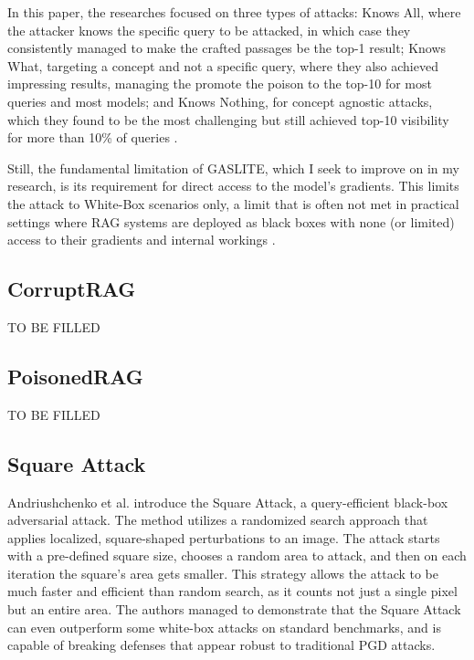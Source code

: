 \documentclass[a4paper, sigconf]{acmart}
\begin{document}
In this paper, the researches focused on three types of attacks: Knows All, where the attacker knows the specific query to be attacked, in which case they consistently managed to make the crafted passages be the top-1 result; Knows What, targeting a concept and not a specific query, where they also achieved impressing results, managing the promote the poison to the top-10 for most queries and most models; and Knows Nothing, for concept agnostic attacks, which they found to be the most challenging but still achieved top-10 visibility for more than 10\% of queries \cite{bentov2024}.
 
Still, the fundamental limitation of GASLITE, which I seek to improve on in my research, is its requirement for direct access to the model's gradients. This limits the attack to White-Box scenarios only, a limit that is often not met in practical settings where RAG systems are deployed as black boxes with none (or limited) access to their gradients and internal workings \cite{bentov2024}. 


\subsection{CorruptRAG}

TO BE FILLED


\subsection{PoisonedRAG}

TO BE FILLED


\subsection{Square Attack}

Andriushchenko et al. \cite{andriushchenko2020} introduce the Square Attack, a query-efficient black-box adversarial attack. The method utilizes a randomized search approach that applies localized, square-shaped perturbations to an image. The attack starts with a pre-defined square size, chooses a random area to attack, and then on each iteration the square's area gets smaller. This strategy allows the attack to be much faster and efficient than random search, as it counts not just a single pixel but an entire area. The authors managed to demonstrate that the Square Attack can even outperform some white-box attacks on standard benchmarks, and is capable of breaking defenses that appear robust to traditional PGD attacks. 
\end{document}
